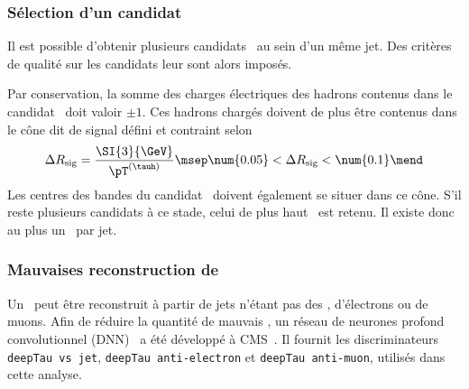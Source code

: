 \subsubsection{Sélection d'un candidat \tauh}
Il est possible d'obtenir plusieurs candidats \tauh\ au sein d'un même jet.
Des critères de qualité sur les candidats leur sont alors imposés.
\par
Par conservation, la somme des charges électriques des hadrons contenus dans le candidat \tauh\ doit valoir $\pm1$.
Ces hadrons chargés doivent de plus être contenus dans le cône dit \og de signal \fg{} défini et contraint selon
\begin{equation}
\Delta R_\text{sig} = \frac{\SI{3}{\GeV}}{\pT^{(\tauh)}}
\msep
\num{0.05} < \Delta R_\text{sig} < \num{0.1}
\mend
\end{equation}
Les centres des bandes du candidat \tauh\ doivent également se situer dans ce cône.
S'il reste plusieurs candidats à ce stade, celui de plus haut \pT\ est retenu.
Il existe donc au plus un \tauh\ par jet.
\subsubsection{Mauvaises reconstruction de \tauh}
Un \tauh\ peut être reconstruit à partir de jets n'étant pas des \tauh, d'électrons ou de muons.
Afin de réduire la quantité de mauvais \tauh, un réseau de neurones profond convolutionnel (DNN)~\cite{DNN} a été développé à CMS~\cite{CMS-DP-2019-033}.
Il fournit les discriminateurs
\texttt{deepTau vs jet},
\texttt{deepTau anti-electron} et
\texttt{deepTau anti-muon},
utilisés dans cette analyse.